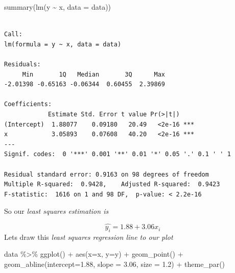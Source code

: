 \documentclass[
  letterpaper,
  DIV=11,
  numbers=noendperiod]{scrreprt}
\newenvironment{Shaded}{\begin{snugshade}}{\end{snugshade}}
\newcommand{\AttributeTok}[1]{\textcolor[rgb]{0.40,0.45,0.13}{#1}}
\newcommand{\FloatTok}[1]{\textcolor[rgb]{0.68,0.00,0.00}{#1}}
\newcommand{\FunctionTok}[1]{\textcolor[rgb]{0.28,0.35,0.67}{#1}}
\newcommand{\NormalTok}[1]{\textcolor[rgb]{0.00,0.23,0.31}{#1}}
\newcommand{\SpecialCharTok}[1]{\textcolor[rgb]{0.37,0.37,0.37}{#1}}
\begin{document}
\begin{Shaded}
\begin{Highlighting}[]
\FunctionTok{summary}\NormalTok{(}\FunctionTok{lm}\NormalTok{(y }\SpecialCharTok{\textasciitilde{}}\NormalTok{ x, }\AttributeTok{data =}\NormalTok{ data))}
\end{Highlighting}
\end{Shaded}

\begin{verbatim}

Call:
lm(formula = y ~ x, data = data)

Residuals:
     Min       1Q   Median       3Q      Max 
-2.01398 -0.65163 -0.06344  0.60455  2.39869 

Coefficients:
            Estimate Std. Error t value Pr(>|t|)    
(Intercept)  1.88077    0.09180   20.49   <2e-16 ***
x            3.05893    0.07608   40.20   <2e-16 ***
---
Signif. codes:  0 '***' 0.001 '**' 0.01 '*' 0.05 '.' 0.1 ' ' 1

Residual standard error: 0.9163 on 98 degrees of freedom
Multiple R-squared:  0.9428,    Adjusted R-squared:  0.9423 
F-statistic:  1616 on 1 and 98 DF,  p-value: < 2.2e-16
\end{verbatim}

So our \emph{least squares estimation is}

\[
\hat{y_i} = 1.88 + 3.06 x_i
\] Lets draw this \emph{least squares regression line to our plot}

\begin{Shaded}
\begin{Highlighting}[]
\NormalTok{data }\SpecialCharTok{\%\textgreater{}\%} 
  \FunctionTok{ggplot}\NormalTok{() }\SpecialCharTok{+} \FunctionTok{aes}\NormalTok{(}\AttributeTok{x=}\NormalTok{x, }\AttributeTok{y=}\NormalTok{y) }\SpecialCharTok{+} \FunctionTok{geom\_point}\NormalTok{() }\SpecialCharTok{+} \FunctionTok{geom\_abline}\NormalTok{(}\AttributeTok{intercept=}\FloatTok{1.88}\NormalTok{, }\AttributeTok{slope =} \FloatTok{3.06}\NormalTok{, }\AttributeTok{size =} \FloatTok{1.2}\NormalTok{) }\SpecialCharTok{+} \FunctionTok{theme\_par}\NormalTok{()}
\end{Highlighting}
\end{Shaded}
\end{document}

